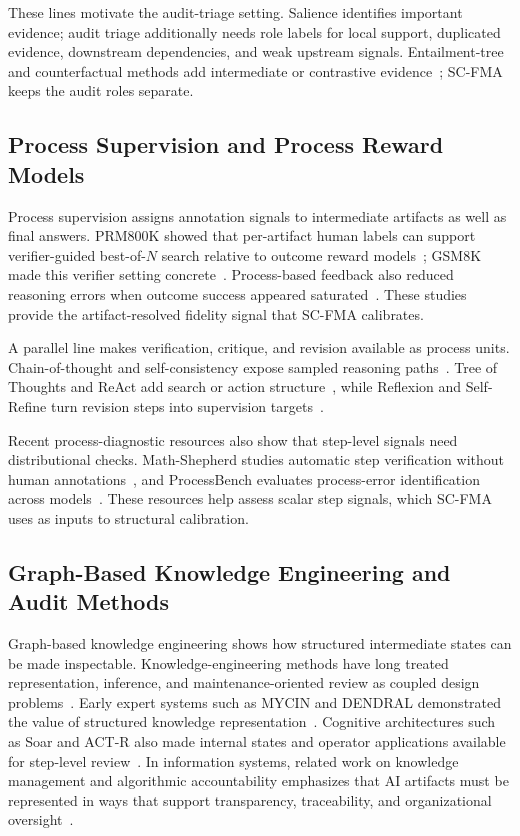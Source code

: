 \documentclass[a4paper,fleqn]{cas-sc}
\begin{document}
These lines motivate the audit-triage setting. Salience identifies important evidence; audit triage additionally needs role labels for local support, duplicated evidence, downstream dependencies, and weak upstream signals. Entailment-tree and counterfactual methods add intermediate or contrastive evidence~\cite{dalvi2021entailmenttrees,wijekoon2023counterfactual}; SC-FMA keeps the audit roles separate.

\subsection{Process Supervision and Process Reward Models}

Process supervision assigns annotation signals to intermediate artifacts as well as final answers. PRM800K showed that per-artifact human labels can support verifier-guided best-of-$N$ search relative to outcome reward models~\cite{lightman2023verify}; GSM8K made this verifier setting concrete~\cite{cobbe2021training}. Process-based feedback also reduced reasoning errors when outcome success appeared saturated~\cite{uesato2022solving}. These studies provide the artifact-resolved fidelity signal that SC-FMA calibrates.

A parallel line makes verification, critique, and revision available as process units. Chain-of-thought and self-consistency expose sampled reasoning paths~\cite{wei2022cot,wang2022selfconsistency}. Tree of Thoughts and ReAct add search or action structure~\cite{yao2023tot,yao2022react}, while Reflexion and Self-Refine turn revision steps into supervision targets~\cite{shinn2023reflexion,madaan2023selfrefine}.

Recent process-diagnostic resources also show that step-level signals need distributional checks. Math-Shepherd studies automatic step verification without human annotations~\cite{wang2024mathshepherd}, and ProcessBench evaluates process-error identification across models~\cite{zheng2024processbench}. These resources help assess scalar step signals, which SC-FMA uses as inputs to structural calibration.

\subsection{Graph-Based Knowledge Engineering and Audit Methods}

Graph-based knowledge engineering shows how structured intermediate states can be made inspectable. Knowledge-engineering methods have long treated representation, inference, and maintenance-oriented review as coupled design problems~\cite{studer1998knowledge}. Early expert systems such as MYCIN and DENDRAL demonstrated the value of structured knowledge representation~\cite{buchanan1984mycin,lindsay1980dendral}. Cognitive architectures such as Soar and ACT-R also made internal states and operator applications available for step-level review~\cite{laird2012soar,anderson2004actr}. In information systems, related work on knowledge management and algorithmic accountability emphasizes that AI artifacts must be represented in ways that support transparency, traceability, and organizational oversight~\cite{dwivedi2021artificial,raji2020closing}.
\end{document}
